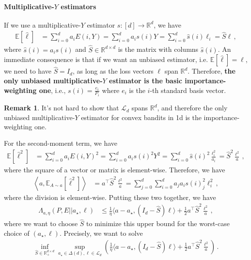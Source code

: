 \documentclass{article}
\theoremstyle{plain}
\theoremstyle{definition}
\newtheorem{remark}[theorem]{Remark}
\newcommand{\R}{\mathbb R}
\newcommand{\E}{\mathbb E}
\newcommand{\cL}{\mathcal L}
\newcommand{\hl}{\hat{\ell}\xspace}
\begin{document}
\paragraph{Multiplicative-$Y$ estimators}
If we use a multiplicative-$Y$ estimator $s:[d]\to \R^d$, we have
\begin{align*}
    \E\!\left[
        \hl
        \right]
     & =
    \sum_{i=0}^{d}
    a_i
    E(i, Y)
    =
    \sum_{i=0}^{d}
    a_i
    s(i)
    Y
    =
    \sum_{i=0}^{d}
    \hat{s}(i)
    \ell_i
    =
    \hat{S}
    \ell\,,
\end{align*}
where $\hat{s}(i) = a_i s(i)$ and $\hat{S} \in \R^{d \times d}$ is the matrix with columns $\hat{s}(i)$.
An immediate consequence is that if we want an unbiased estimator, i.e. $\E[\hl] = \ell$,
we need to have $\hat{S} = I_d$, as long as the loss vectors $\ell$ span $\R^d$.
Therefore, \textbf{the only unbiased multiplicative-$Y$ estimator is the basic importance-weighting one},
i.e., $s(i) = \frac{e_i}{P_i}$ where $e_i$ is the $i$-th standard basis vector.
\begin{remark}
    It's not hard to show that $\cL_d$ spans $\R^d$, and therefore the only unbiased multiplicative-$Y$ estimator for convex bandits in 1d is the importance-weighting one.
\end{remark}

For the second-moment term, we have
\begin{align*}
    \E\!\left[
        \hl^2
        \right]
     & =
    \sum_{i=0}^{d}
    a_i
    E(i, Y)^2
    =
    \sum_{i=0}^{d}
    a_i
    s(i)^2
    Y^2
    =
    \sum_{i=0}^{d}
    \hat{s}(i)^2
    \frac{
        \ell_i^2}{a_i}
    =
    \hat{S}^2
    \frac{\ell^2}{a}\,,
\end{align*}
where the square of a vector or matrix is element-wise.
Therefore, we have
\begin{align*}
    \left\langle
    a,
    \E_{A \sim a}\!
    \left[\hl^2\right]
    \right\rangle
     & =
    a^\top
    \hat{S}^2
    \frac{\ell^2}{a}
    =
    \sum_{j=0}^{d}
    \sum_{i=0}^{d}
    a_j
    a_i
    s(i)_j^2
    \ell_i^2
    \,,
\end{align*}
where the division is element-wise.
Putting these two together, we have
\begin{align*}
    \Lambda_{a, \eta}(P, E || a_\star, \ell)
     & \leq
    \frac{1}{\eta}
    \langle a - a_\star, (I_d - \hat{S}) \ell \rangle
    +
    \frac{1}{2}
    a^\top
    \hat{S}^2
    \frac{\ell^2}{a}\,,
\end{align*}
where we want to choose $\hat{S}$ to minimize this upper bound
for the worst-case choice of $(a_\star, \ell)$.
Precisely, we want to solve
\begin{align*}
    \inf_{\hat{S} \in \R_+^{d \times d}}
    \sup_{a_\star \in \Delta(d), \ell \in \cL_d}
    \left(
    \frac{1}{\eta}
    \langle a - a_\star, (I_d - \hat{S}) \ell \rangle
    +
    \frac{1}{2}
    a^\top
    \hat{S}^2
    \frac{\ell^2}{a}
    \right)\,.
\end{align*}
\end{document}

